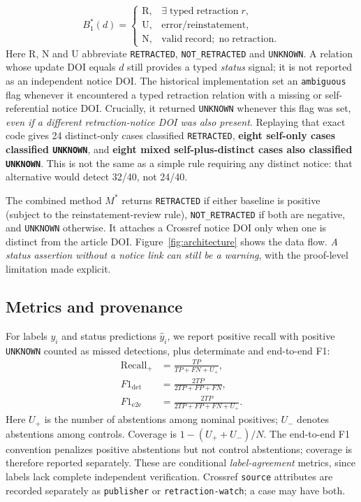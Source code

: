 \documentclass[10pt,a4paper,twocolumn]{article}
\begin{document}
\begin{equation}
 B_1^*(d)=\begin{cases}
   \mathrm{R},&\exists\;\mathrm{typed\;retraction}\;r,\\
   \mathrm{U},&\mathrm{error/reinstatement},\\
   \mathrm{N},&\mathrm{valid\;record;\;no\;retraction}.
 \end{cases}
 \label{eq:status}
\end{equation}
\noindent Here R, N and U abbreviate \texttt{RETRACTED}, \texttt{NOT\_RETRACTED} and \texttt{UNKNOWN}.
A relation whose update DOI equals $d$ still provides a typed \emph{status} signal; it is not reported as an independent notice DOI. The historical implementation set an \texttt{ambiguous} flag whenever it encountered a typed retraction relation with a missing or self-referential notice DOI. Crucially, it returned \texttt{UNKNOWN} whenever this flag was set, \emph{even if a different retraction-notice DOI was also present}. Replaying that exact code gives 24 distinct-only cases classified \texttt{RETRACTED}, \textbf{eight self-only cases classified \texttt{UNKNOWN}}, and \textbf{eight mixed self-plus-distinct cases also classified \texttt{UNKNOWN}}. This is not the same as a simple rule requiring any distinct notice: that alternative would detect 32/40, not 24/40.

The combined method $M^*$ returns \texttt{RETRACTED} if either baseline is positive (subject to the reinstatement-review rule), \texttt{NOT\_RETRACTED} if both are negative, and \texttt{UNKNOWN} otherwise. It attaches a Crossref notice DOI only when one is distinct from the article DOI. Figure~\ref{fig:architecture} shows the data flow. \emph{A status assertion without a notice link can still be a warning}, with the proof-level limitation made explicit.

\subsection{Metrics and provenance}
For labels $y_i$ and status predictions $\hat y_i$, we report positive recall with positive \texttt{UNKNOWN} counted as missed detections, plus determinate and end-to-end F1:
\begin{equation}
\begin{aligned}
\mathrm{Recall}_{+}&=\frac{TP}{TP+FN+U_{+}},\\
F1_{\mathrm{det}}&=\frac{2TP}{2TP+FP+FN},\\
F1_{\mathrm{e2e}}&=\frac{2TP}{2TP+FP+FN+U_{+}}.
\end{aligned}
\label{eq:metric}
\end{equation}
Here $U_+$ is the number of abstentions among nominal positives; $U_-$ denotes abstentions among controls. Coverage is $1-(U_++U_-)/N$. The end-to-end F1 convention penalizes positive abstentions but not control abstentions; coverage is therefore reported separately. These are conditional \emph{label-agreement} metrics, since labels lack complete independent verification. Crossref \texttt{source} attributes are recorded separately as \texttt{publisher} or \texttt{retraction-watch}; a case may have both.
\end{document}
